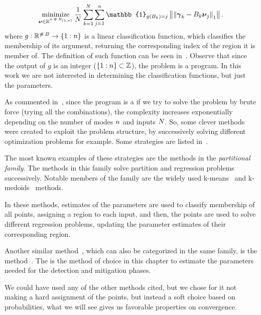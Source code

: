 \documentclass[../main.tex]{subfiles}
\begin{document}
\begin{equation}
    \minimize_{\pwaestparam \in \R^{\pwaestnumparam \card{\elem[1,*]{\pwaestsysinput}}}} \frac{1}{\pwaestinputsize} \sum_{k=1}^{\pwaestinputsize} \sum_{j=1}^{\pwaestnumparam} \mathbb{1}_{g\left(\pwaestsysinput_{k}\right)=j} \norm{\norm{\pwaestsysoutput_{k}- \pwaestsysinput_{k}\pwaestparam_{j}}_{1}}.
\end{equation}
where $g:\mathbb{R}^{\operatorname{\#}{{B}}}\to\{1:{n}\}$ is a linear classification function, which classifies the membership of its argument, returning the corresponding index of the region it is member of.
The definition of such function can be seen in~\cite{LauerBloch2019}.
Observe that since the output of $g$ is an integer ($\{1:{n}\}\subset\mathbb{Z}$), the problem is a \miqp{} program.
In this work we are not interested in determining the classification functions,  but just the parameters.

As commented in~\cite{LauerBloch2019}, since the program is a \miqp{} if we try to solve the problem by brute force (trying all the combinations), the complexity increases exponentially depending on the number of modes ${n}$ and inputs ${N}$.
So, some clever methods were created to exploit the problem structure, by successively solving different optimization problems for example. Some strategies are listed in~\cite{RollEtAl2004}.

The most known examples of these strategies are the methods in the \emph{partitional family}.
The methods in this family solve partition and regression problems successively.
Notable members of the family are the widely used k-means~\cite{Ferrari-TrecateEtAl2001} and k-medoids~\cite{Bishop2006} methods.

In these methods, estimates of the parameters are used to classify membership of all points, assigning a region to each input, and then, the points are used to solve different regression problems, updating the parameter estimates of their corresponding region.

Another similar method~\cite{Bishop2006}, which can also be categorized in the same family, is the \EM{} method~\cite{DempsterEtAl1977}.
The \EM{} is the method of choice in this chapter to estimate the parameters needed for the detection and mitigation phases.

We could have used any of the other methods cited, but we chose \EM{} for it not making a hard assignment of the points, but instead a soft choice based on probabilities, what we will see gives us favorable properties on convergence.
\end{document}

